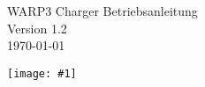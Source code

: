 \documentclass[a4paper,10pt]{article}
\title{}
\author{}
\newcommand{\gfx}[1]{\texttt{[image: \#1]}}
\begin{document}
\pagestyle{empty}
\begin{titlepage}
    \vspace*{-3.08cm}
    \vfill
    \begin{center}
		\color{white}
        \Huge
        WARP3 Charger Betriebsanleitung\\\vspace{1cm}
        \large
        Version 1.2\\\vspace{0.25cm}
        \today
    \end{center}
    \vfill \gfx{./img_warp3/resized/front.png}
	\pagecolor{covergray}
\end{titlepage}
\newpage
\pagecolor{white}
\null
\newpage
\pagestyle{fancy}
\end{document}
